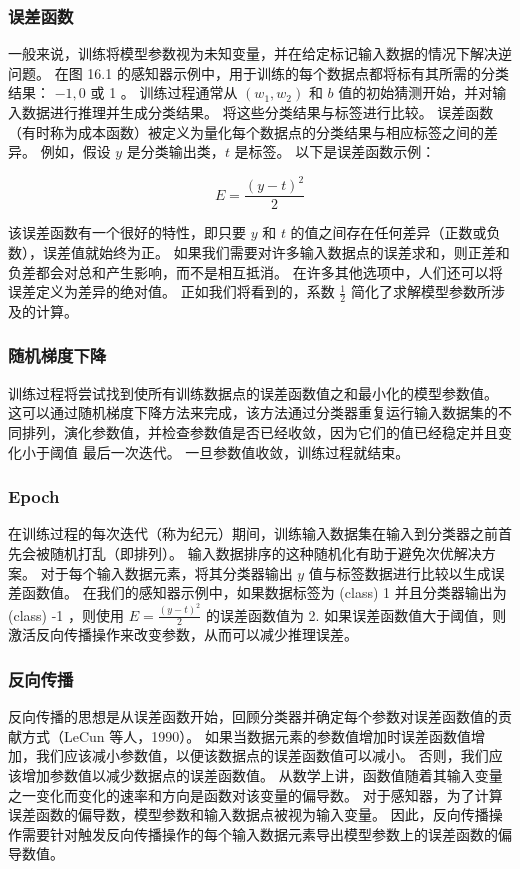 \subsubsection{误差函数}
一般来说，训练将模型参数视为未知变量，并在给定标记输入数据的情况下解决逆问题。 在图 16.1 的感知器示例中，用于训练的每个数据点都将标有其所需的分类结果： $-1,0$ 或 1 。 训练过程通常从 $\left(w_{1}, w_{2}\right)$ 和 $b$ 值的初始猜测开始，并对输入数据进行推理并生成分类结果。 将这些分类结果与标签进行比较。 误差函数（有时称为成本函数）被定义为量化每个数据点的分类结果与相应标签之间的差异。 例如，假设 $y$ 是分类输出类，$t$ 是标签。 以下是误差函数示例：

$$
E=\frac{(y-t)^{2}}{2}
$$

该误差函数有一个很好的特性，即只要 $y$ 和 $t$ 的值之间存在任何差异（正数或负数），误差值就始终为正。 如果我们需要对许多输入数据点的误差求和，则正差和负差都会对总和产生影响，而不是相互抵消。 在许多其他选项中，人们还可以将误差定义为差异的绝对值。 正如我们将看到的，系数 $\frac{1}{2}$ 简化了求解模型参数所涉及的计算。

\subsubsection{随机梯度下降}
训练过程将尝试找到使所有训练数据点的误差函数值之和最小化的模型参数值。 这可以通过随机梯度下降方法来完成，该方法通过分类器重复运行输入数据集的不同排列，演化参数值，并检查参数值是否已经收敛，因为它们的值已经稳定并且变化小于阈值 最后一次迭代。 一旦参数值收敛，训练过程就结束。

\subsubsection{Epoch}
在训练过程的每次迭代（称为纪元）期间，训练输入数据集在输入到分类器之前首先会被随机打乱（即排列）。 输入数据排序的这种随机化有助于避免次优解决方案。 对于每个输入数据元素，将其分类器输出 $y$ 值与标签数据进行比较以生成误差函数值。 在我们的感知器示例中，如果数据标签为 (class) 1 并且分类器输出为 (class) -1 ，则使用 $E=\frac{(y-t)^{2}}{2}$ 的误差函数值为 2. 如果误差函数值大于阈值，则激活反向传播操作来改变参数，从而可以减少推理误差。

\subsubsection{反向传播}
反向传播的思想是从误差函数开始，回顾分类器并确定每个参数对误差函数值的贡献方式（LeCun 等人，1990）。 如果当数据元素的参数值增加时误差函数值增加，我们应该减小参数值，以便该数据点的误差函数值可以减小。 否则，我们应该增加参数值以减少数据点的误差函数值。 从数学上讲，函数值随着其输入变量之一变化而变化的速率和方向是函数对该变量的偏导数。 对于感知器，为了计算误差函数的偏导数，模型参数和输入数据点被视为输入变量。 因此，反向传播操作需要针对触发反向传播操作的每个输入数据元素导出模型参数上的误差函数的偏导数值。

